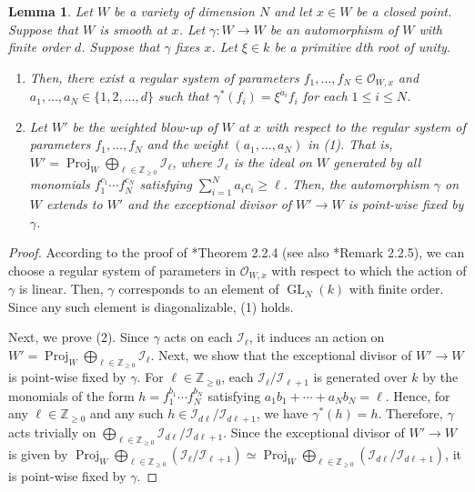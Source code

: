 \documentclass[a4paper,11pt]{amsart}
\newtheorem{lem}[thm]{Lemma}
\theoremstyle{definition}
\theoremstyle{remark}
\begin{document}
\begin{lem}\label{lem:wb}
Let $W$ be a variety of dimension $N$ and let $x \in W$ be a closed point. 
Suppose that $W$ is smooth at $x$. 
Let $\gamma : W \to W$ be an automorphism of $W$ with finite order $d$. 
Suppose that $\gamma$ fixes $x$. 
Let $\xi \in k$ be a primitive $d$th root of unity. 
\begin{enumerate}
\item
Then, there exist a regular system of parameters $f_1, \ldots , f_{N} \in \mathcal{O}_{W, x}$ and $a_1, \ldots , a_N \in \{ 1, 2 , \ldots , d \}$ such that 
$\gamma ^* (f_i) = \xi ^{a_i}  f_i$ for each $1 \le i \le N$. 

\item
Let $W'$ be the weighted blow-up of $W$ at $x$ with respect to the regular system of parameters $f_1, \ldots , f_{N}$ and the weight $(a_1, \ldots, a_N)$ in (1). 
That is, $W'=\operatorname{Proj}_W \bigoplus_{\ell \in \mathbb{Z}_{\ge 0}} \mathcal{I}_{\ell} $, where $\mathcal{I}_{\ell}$ is the ideal on $W$ generated by all monomials $f_1^{c_1}\cdots f_{N}^{c_N}$ satisfying $\sum_{i=1}^N a_i c_i \ge \ell$.
Then, the automorphism $\gamma$ on $W$ extends to $W'$ and the exceptional divisor of $W' \to W$ is point-wise fixed by $\gamma$. 
\end{enumerate}
\end{lem}
\begin{proof}
According to the proof of \cite{Kaw24}*{Theorem 2.2.4} (see also \cite{Kaw24}*{Remark 2.2.5}), we can choose a regular system of parameters in $\mathcal{O}_{W, x}$ with respect to which the action of $\gamma$ is linear. 
Then, $\gamma$ corresponds to an element of $\operatorname{GL}_N(k)$ with finite order. 
Since any such element is diagonalizable, (1) holds. 

Next, we prove (2). 
Since $\gamma$ acts on each $\mathcal{I}_{\ell}$, 
it induces an action on $W'=\operatorname{Proj}_W \bigoplus_{\ell \in \mathbb{Z}_{\ge 0}} \mathcal{I}_{\ell}$. 
Next, we show that the exceptional divisor of $W' \to W$ is point-wise fixed by $\gamma$. 
For $\ell \in \mathbb Z_{\ge 0}$, each $\mathcal{I}_{\ell}/\mathcal{I}_{\ell+1}$ is generated over $k$ by the monomials of the form $h = f_1^{b_1} \cdots f_N^{b_N}$ satisfying $a_1 b_1 + \cdots + a_N b_N = \ell$.
Hence, for any $\ell \in \mathbb{Z}_{\ge 0}$ and any such $h \in \mathcal{I}_{d\ell}/\mathcal{I}_{d\ell+1}$, we have $\gamma^*(h) = h$.
Therefore, $\gamma$ acts trivially on $\bigoplus_{\ell \in \mathbb{Z}_{\ge 0}} \mathcal{I}_{d\ell}/\mathcal{I}_{d\ell+1}$.
Since the exceptional divisor of $W' \to W$ is given by
$\operatorname{Proj}_W \bigoplus_{\ell \in \mathbb{Z}_{\ge 0}} \left(\mathcal{I}_{\ell}/\mathcal{I}_{\ell+1}\right) \simeq \operatorname{Proj}_W \bigoplus_{\ell \in \mathbb{Z}_{\ge 0}} \left(\mathcal{I}_{d\ell}/\mathcal{I}_{d\ell+1}\right)$, 
it is point-wise fixed by $\gamma$.
\end{proof}
\end{document}
